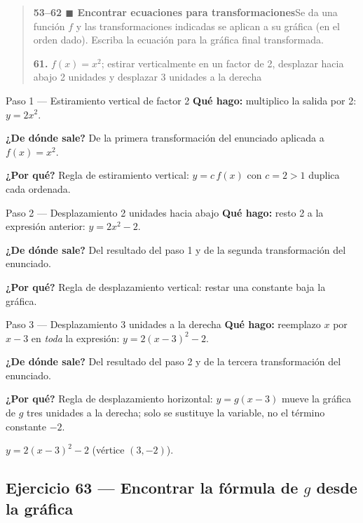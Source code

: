 \documentclass[11pt]{article}
\begin{document}
\begin{quote}
\textbf{53--62 $\blacksquare$ Encontrar ecuaciones para transformaciones}\quad Se da una función $f$ y las transformaciones indicadas se aplican a su gráfica (en el orden dado). Escriba la ecuación para la gráfica final transformada.

\textbf{61.} $f(x)=x^2$; estirar verticalmente en un factor de 2, desplazar hacia abajo 2 unidades y desplazar 3 unidades a la derecha
\end{quote}

\begin{paso}{Paso 1 --- Estiramiento vertical de factor 2}
\textbf{Qué hago:} multiplico la salida por 2: $y=2x^2$.

\textbf{¿De dónde sale?} De la primera transformación del enunciado aplicada a $f(x)=x^2$.

\textbf{¿Por qué?} Regla de estiramiento vertical: $y=c\,f(x)$ con $c=2>1$ duplica cada ordenada.
\end{paso}

\begin{paso}{Paso 2 --- Desplazamiento 2 unidades hacia abajo}
\textbf{Qué hago:} resto 2 a la expresión anterior: $y=2x^2-2$.

\textbf{¿De dónde sale?} Del resultado del paso 1 y de la segunda transformación del enunciado.

\textbf{¿Por qué?} Regla de desplazamiento vertical: restar una constante baja la gráfica.
\end{paso}

\begin{paso}{Paso 3 --- Desplazamiento 3 unidades a la derecha}
\textbf{Qué hago:} reemplazo $x$ por $x-3$ en \emph{toda} la expresión: $y=2(x-3)^2-2$.

\textbf{¿De dónde sale?} Del resultado del paso 2 y de la tercera transformación del enunciado.

\textbf{¿Por qué?} Regla de desplazamiento horizontal: $y=g(x-3)$ mueve la gráfica de $g$ tres unidades a la derecha; solo se sustituye la variable, no el término constante $-2$.
\end{paso}

\begin{resp}
$y=2(x-3)^2-2$ \quad (vértice $(3,-2)$).
\end{resp}

\subsection*{Ejercicio 63 — Encontrar la fórmula de $g$ desde la gráfica}
\end{document}
